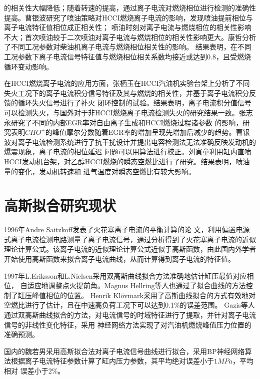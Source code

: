 的相关性大幅降低；随着转速的提高，通过离子电流对燃烧相位进行检测的准确性提高。曹银波研究了喷油策略对HCCI燃烧离子电流的影响，发现喷油提前相位与离子电流特征值相位成正相关性；
喷油时刻对离子电流与燃烧相位的相关性影响不大；首次喷油较于二次喷油对离子电流与燃烧相位的相关性影响更大。康哲\cite{kz2014wzj}分析了不同工况参数对柴油机离子电流与燃烧相位相关性的影响。
结果表明，在不同工况参数下离子电流信号特征值与燃烧相位相关系数均接近或达到0.8，且受燃烧循环变动影响。\par
在HCCI燃烧离子电流的应用方面，张栖玉\cite{zqy2011}在HCCI汽油机实验台架上分析了不同失火工况下的离子电流积分信号特征及其与燃烧的相关性，并基于离子电流积分反馈的循环失火信号进行了补火
闭环控制的试验。结果表明，离子电流积分值信号可以检测失火，与国外对于非HCCI燃烧离子电流检测失火的研究结果一致。张志永\cite{zzy2009nb}研究了不同的内部EGR率对自由离子生成和HCCI燃烧过程诸参数
的影响，研究表明$CHO^+$的峰值摩尔分数随着EGR率的增加呈现先增加后减少的趋势。曹银波\cite{cyb2012}对离子电流检测系统进行了抗干扰设计并提出电容检测法无法准确反映发动机的爆震现象，离子电流的相位延迟
问题可以用算法进行校正。刘寅童\cite{lyt2013dj}利用缸内直喷HCCI发动机台架，对乙醇HCCI燃烧的瞬态空燃比进行了研究。结果表明，喷油量的变化，发动机转速和
进气温度对瞬态空燃比有较大影响。\par
\section{高斯拟合研究现状}
1996年Andre Saitzkoff\cite{saitzkoff1996ionization}发表了火花塞离子电流的平衡计算的论
文，利用偏置电源式离子电流检测电路测量了离子电流信号，通过分析得到了火花塞离子电流的近似理论计算公式。该离子电流的近似理论计算公式近似于高斯函数，由此国内外学者
开始使用高斯函数来拟合离子电流曲线，从而计算得到离子电流的特征值。\par
1997年L.Eriksson和L.Nielsen\cite{eriksson1996ignition,eriksson1997closed,eriksson1997ionization}采用双高斯曲线拟合方法准确地估计缸压最值对应相位，
自适应地调整点火提前角。Magnus Hellring\cite{hellring2001comparison}等人也通过了拟合曲线的方法控制了缸压峰值相位的位置。
Henrik Kl\"{o}vmark\cite{klovmark2000estimating}采用了高斯曲线拟合的方式有效地对空燃比进行了估计，且在中速高负荷工况下可以达到0.1\%的误差范围。
Gazis等人\cite{panousakis2006ion}通过双高斯曲线拟合的方法，对电流信号的时域特征进行了提取，并针对离子电流信号的非线性变化特征，采用
神经网络方法实现了对汽油机燃烧峰值压力位置的准确预测。\par
国内的魏若男\cite{wrn2013}采用高斯拟合法对离子电流信号曲线进行拟合，采用BP神经网络算法根据离子电流特征参数计算了缸内压力参数，其平均绝对误差小于$1\si{MPa}$，平均相对
误差小于2\%。
